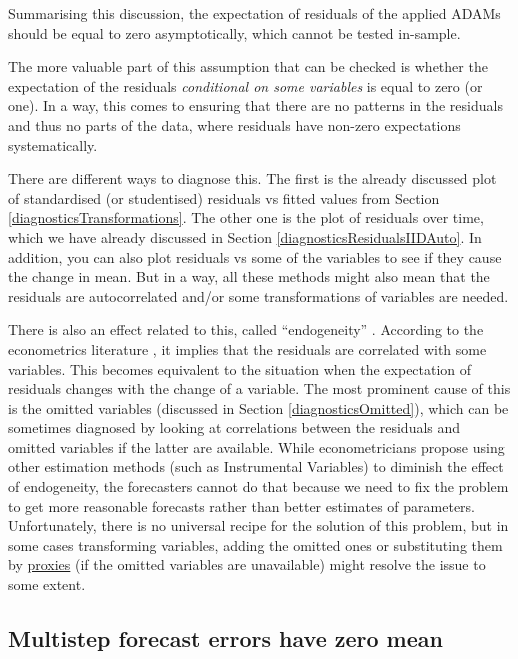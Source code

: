 \documentclass[]{book}
\theoremstyle{definition}
\theoremstyle{definition}
\theoremstyle{definition}
\theoremstyle{definition}
\theoremstyle{remark}
\begin{document}
Summarising this discussion, the expectation of residuals of the applied ADAMs should be equal to zero asymptotically, which cannot be tested in-sample.

The more valuable part of this assumption that can be checked is whether the expectation of the residuals \emph{conditional on some variables} is equal to zero (or one). In a way, this comes to ensuring that there are no patterns in the residuals and thus no parts of the data, where residuals have non-zero expectations systematically.

There are different ways to diagnose this. The first is the already discussed plot of standardised (or studentised) residuals vs fitted values from Section \ref{diagnosticsTransformations}. The other one is the plot of residuals over time, which we have already discussed in Section \ref{diagnosticsResidualsIIDAuto}. In addition, you can also plot residuals vs some of the variables to see if they cause the change in mean. But in a way, all these methods might also mean that the residuals are autocorrelated and/or some transformations of variables are needed.

There is also an effect related to this, called ``endogeneity'' \citep[discussed briefly in Section 12.3 of][]{SvetunkovSBA}. According to the econometrics literature \citep[see for example,][]{Hanck2020}, it implies that the residuals are correlated with some variables. This becomes equivalent to the situation when the expectation of residuals changes with the change of a variable. The most prominent cause of this is the omitted variables (discussed in Section \ref{diagnosticsOmitted}), which can be sometimes diagnosed by looking at correlations between the residuals and omitted variables if the latter are available. While econometricians propose using other estimation methods (such as Instrumental Variables) to diminish the effect of endogeneity, the forecasters cannot do that because we need to fix the problem to get more reasonable forecasts rather than better estimates of parameters. Unfortunately, there is no universal recipe for the solution of this problem, but in some cases transforming variables, adding the omitted ones or substituting them by \href{https://en.wikipedia.org/wiki/Proxy_(statistics)}{proxies} (if the omitted variables are unavailable) might resolve the issue to some extent.

\hypertarget{diagnosticsResidualsIIDExpectationMultiple}{%
\subsection{Multistep forecast errors have zero mean}\label{diagnosticsResidualsIIDExpectationMultiple}}
\end{document}
